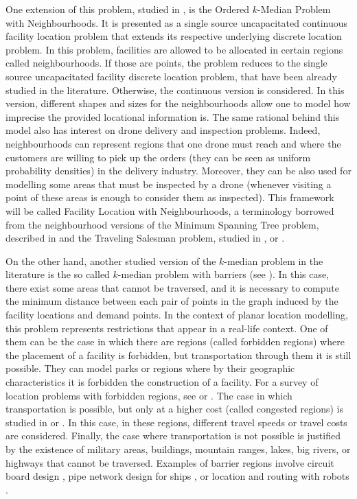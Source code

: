 \documentclass[a4paper,  review, authoryear, 1p.]{elsarticle}
\newcommand{\JP}[1]{{\color{armygreen}#1}}
\newcommand{\CV}[1]{{\color{blue}#1}}
\begin{document}
	\CV{One extension of this problem, studied in \cite{blanco2019}, is the Ordered $k$-Median Problem with Neighbourhoods. It} is presented as a single source uncapacitated continuous facility location problem that extends its respective underlying discrete location problem. In this problem, facilities are allowed to be allocated in certain regions called neighbourhoods. If those are points, the problem reduces to the single source uncapacitated facility discrete location problem, that have been already studied in the literature. Otherwise, the continuous version is considered. In this version, different shapes and sizes for the neighbourhoods allow one to model how imprecise the provided locational information is. \JP{The same rational behind this model also has interest on drone delivery and inspection problems. Indeed, neighbourhoods can represent regions that one drone must reach and where the customers are willing to pick up the orders (they can be seen as uniform probability densities) in the delivery industry. Moreover, they can be also used for modelling some areas that must be inspected by a drone (whenever visiting a point of these areas is enough to consider them as inspected).} This framework will be called Facility Location with Neighbourhoods, a terminology borrowed from the neighbourhood versions of the Minimum Spanning Tree problem, described in \citet{blanco2017} and the Traveling Salesman problem, studied in \citet{gentilini2013}, \citet{yuan2017} or \citet{puerto2022a}.
	
	\JP{On the other hand, another studied version of the $k$-median problem in the literature is the so called $k$-median problem with barriers (see \citet{klamroth2002}). In this case, there exist some areas that cannot be traversed, and it is necessary to compute the minimum distance between each pair of points in the graph induced by the facility locations and demand points. In the context of planar location modelling, this problem represents restrictions that appear in a real-life context. One of them can be the case in which there are regions (called forbidden regions) where the placement of a facility is forbidden, but transportation  through them it  is still possible. They can model  parks or regions where by their geographic characteristics it is forbidden the construction of a facility. For a survey of location problems with forbidden regions, see \cite{hamacher1995} or \cite{nickel1995}. The case in which transportation is possible, but only at a higher cost (called congested regions) is studied in \cite{butt1996} or \cite{mitchell1991}. In this case, in these regions, different travel speeds or travel costs are considered. Finally, the case where transportation is not possible is justified by the existence of military areas, buildings, mountain ranges, lakes, big rivers, or highways that cannot be traversed. Examples of barrier regions involve circuit board design \citep{lapaugh1980}, pipe network design for ships \citep{wangdahl1974}, \citep{blanco2022} or location and routing with robots \citep{lozano-perez1979}. }
	
\end{document}
